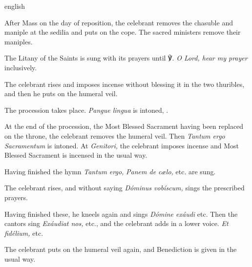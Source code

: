 \documentclass[benediction_assumption_la_en.tex]{subfiles}
\begin{document}
\myrule


{english}
{After Mass on the day of reposition, the celebrant removes the chasuble and maniple
at the sedilia and puts on the cope. The sacred ministers remove their maniples.

The Litany of the Saints is sung with its prayers until ℣.
\textit{O Lord, hear my prayer} inclusively.

The celebrant rises and imposes incense without blessing it in the two thuribles, and then he puts on the humeral veil.

The procession takes place. \textit{Pangue lingua} is intoned, \pageref{hy_pange_lingua_corpus_christi_solesmes}.

At the end of the procession, the Most Blessed Sacrament having been replaced on the throne, the celebrant removes the humeral veil. Then \textit{Tantum ergo Sacramentum} is intoned. At \textit{Genitori,} the celebrant imposes incense and Most Blessed Sacrament is incensed in the usual way.

Having finished the hymn \textit{Tantum ergo,} \textit{Panem de cælo,} etc. are sung.

The celebrant rises, and without saying \textit{Dóminus vobíscum,} sings the prescribed prayers.

Having finished these, he kneels again and sings \textit{Dómine exáudi} etc. Then the cantors sing
\textit{Exáudiat nos,} etc., and the celebrant adds in a lower voice. \textit{Et fidélium,} etc.

The celebrant puts on the humeral veil again, and Benediction is given in the usual way.}
\end{document}
